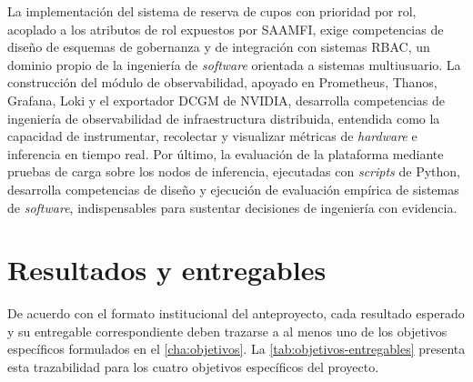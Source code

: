 La implementación del sistema de reserva de cupos con prioridad por rol, acoplado a los atributos de rol expuestos por SAAMFI, exige competencias de diseño de esquemas de gobernanza y de integración con sistemas RBAC, un dominio propio de la ingeniería de \emph{software} orientada a sistemas multiusuario. La construcción del módulo de observabilidad, apoyado en Prometheus, Thanos, Grafana, Loki y el exportador DCGM de NVIDIA, desarrolla competencias de ingeniería de observabilidad de infraestructura distribuida, entendida como la capacidad de instrumentar, recolectar y visualizar métricas de \emph{hardware} e inferencia en tiempo real. Por último, la evaluación de la plataforma mediante pruebas de carga sobre los nodos de inferencia, ejecutadas con \emph{scripts} de Python, desarrolla competencias de diseño y ejecución de evaluación empírica de sistemas de \emph{software}, indispensables para sustentar decisiones de ingeniería con evidencia.

\section{Resultados y entregables}

De acuerdo con el formato institucional del anteproyecto, cada resultado esperado y su entregable correspondiente deben trazarse a al menos uno de los objetivos específicos formulados en el \cref{cha:objetivos}. La \cref{tab:objetivos-entregables} presenta esta trazabilidad para los cuatro objetivos específicos del proyecto.

